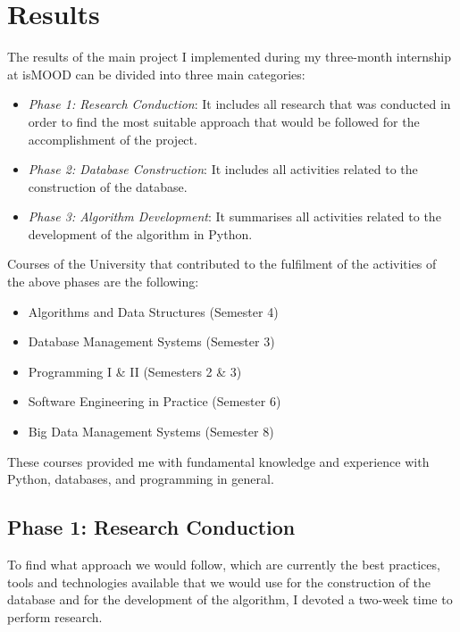 \section{Results}
\label{sec:results}

The results of the main project I implemented
during my three-month internship at isMOOD can be divided
into three main categories:

\begin{itemize}
  \item \emph{Phase 1: Research Conduction}: It includes all research that was conducted
  in order to find the most suitable approach
  that would be followed for the accomplishment of the project. 
  \item \emph{Phase 2: Database Construction}: It includes all activities related to the construction
  of the database.
  \item \emph{Phase 3: Algorithm Development}: It summarises all activities related to the development
  of the algorithm in Python.
\end{itemize}

Courses of the University that contributed to the fulfilment
of the activities of the above phases are the following:

\begin{itemize}
 \item Algorithms and Data Structures (Semester 4)
 \item Database Management Systems (Semester 3)
 \item Programming I \& II (Semesters 2 \& 3)
 \item Software Engineering in Practice (Semester 6)
 \item Big Data Management Systems (Semester 8)
\end{itemize}

These courses provided me with fundamental knowledge and experience
with Python, databases, and programming in general.

\subsection{Phase 1: Research Conduction}
\label{subsec:research}

To find what approach we would follow,
which are currently the best practices, tools and technologies available
that we would use for the construction of the database
and for the development of the algorithm,
I devoted a two-week time to perform research.

